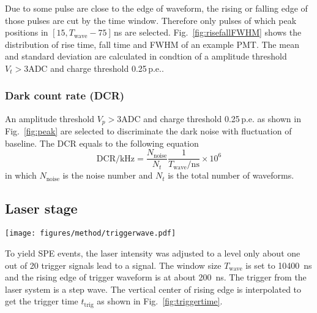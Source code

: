 Due to some pulse are close to the edge of waveform, the rising or falling edge of those pulses are cut by the time window. Therefore only pulses of which peak positions in $[15, T_{\mathrm{wave}}-75]$\,ns are selected. Fig.~\ref{fig:risefallFWHM} shows the distribution of rise time, fall time and FWHM of an example PMT. The mean and standard deviation are calculated in condtion of a amplitude threshold $V_{t}>3\mathrm{ADC}$ and charge threshold 0.25\,p.e..

\subsubsection{Dark count rate (DCR)}
An amplitude threshold $V_{p}>3\mathrm{ADC}$ and charge threshold 0.25\,p.e. as shown in Fig.~\ref{fig:peak} are selected to discriminate the dark noise with fluctuation of baseline. The DCR equals to the following equation
\begin{equation}
    \mathrm{DCR/kHz} = \frac{N_{\mathrm{noise}}}{N_{t}}\frac{1}{T_{\mathrm{wave}}/\mathrm{ns}}\times 10^{6}
\end{equation}
in which $N_{\mathrm{noise}}$ is the noise number and $N_{t}$ is the total number of waveforms.

\subsection{Laser stage}
\label{sec:laserstage}

\begin{figure*}[!htbp]
    \centering
    \texttt{[image: figures/method/triggerwave.pdf]}
    \caption{An example of waveform in laser stage. The orange line is the trigger waveform. Two blue horizonal dash line are the upper and lower values of step wave. Green cross point is the interpolation for trigger time. The magnified axes shows the PMT waveform with a signal. Red and green vertical dash line are the time of 10\% of rising edge and pulse peak.}
    \label{fig:triggertime}
\end{figure*}

To yield SPE events, the laser intensity was adjusted to a level only about one out of 20 trigger signals lead to a signal. The window size $T_{\mathrm{wave}}$ is set to \SI{10400}{ns} and the rising edge of trigger waveform is at about \SI{200}{ns}. The trigger from the laser system is a step wave. The vertical center of rising edge is interpolated to get the trigger time $t_{\mathrm{trig}}$ as shown in Fig.~\ref{fig:triggertime}.

